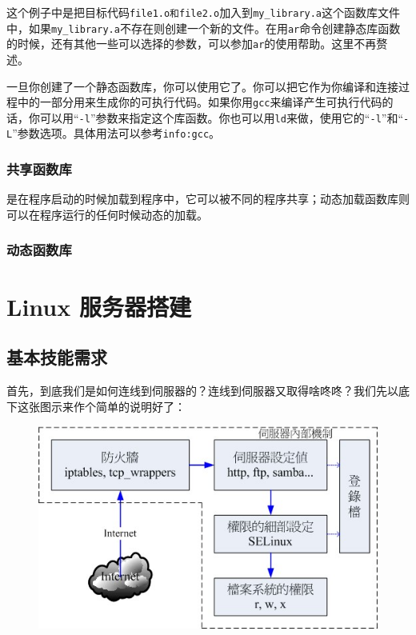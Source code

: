 \documentclass[UTF8,a4paper,12pt]{ctexbook}
\begin{document}
			这个例子中是把目标代码\verb|file1.o和file2.o|加入到\verb|my_library.a|这个函数库文件中，如果\verb|my_library.a|不存在则创建一个新的文件。在用\verb|ar|命令创建静态库函数的时候，还有其他一些可以选择的参数，可以参加\verb|ar|的使用帮助。这里不再赘述。
			
			一旦你创建了一个静态函数库，你可以使用它了。你可以把它作为你编译和连接过程中的一部分用来生成你的可执行代码。如果你用\verb|gcc|来编译产生可执行代码的话，你可以用“\verb|-l|”参数来指定这个库函数。你也可以用\verb|ld|来做，使用它的“\verb|-l|”和“\verb|-L|”参数选项。具体用法可以参考\verb|info:gcc|。 
			
		\subsection{共享函数库}是在程序启动的时候加载到程序中，它可以被不同的程序共享；动态加载函数库则可以在程序运行的任何时候动态的加载。
		
		\subsection{动态函数库}
		
		
\chapter{Linux 服务器搭建}
	\section{基本技能需求}
		首先，到底我们是如何连线到伺服器的？连线到伺服器又取得啥咚咚？我们先以底下这张图示来作个简单的说明好了：
		
		\begin{figure}[h]
			\centering
			\includegraphics[scale = 0.8]{linuxServerExample.jpg}
		\end{figure}
		
\end{document}
